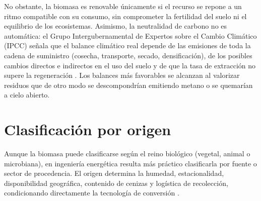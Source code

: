 No obstante, la biomasa es renovable únicamente si el recurso se repone a un ritmo compatible con su consumo, sin comprometer la fertilidad del suelo ni el equilibrio de los ecosistemas. Asimismo, la neutralidad de carbono no es automática: el Grupo Intergubernamental de Expertos sobre el Cambio Climático (IPCC) señala que el balance climático real depende de las emisiones de toda la cadena de suministro (cosecha, transporte, secado, densificación), de los posibles cambios directos e indirectos en el uso del suelo y de que la tasa de extracción no supere la regeneración \cite{chum2011ipcc}. Los balances más favorables se alcanzan al valorizar residuos que de otro modo se descompondrían emitiendo metano o se quemarían a cielo abierto.

\section{Clasificación por origen}
\label{sec:clasificacion_origen}

Aunque la biomasa puede clasificarse según el reino biológico (vegetal, animal o microbiana), en ingeniería energética resulta más práctico clasificarla por fuente o sector de procedencia. El origen determina la humedad, estacionalidad, disponibilidad geográfica, contenido de cenizas y logística de recolección, condicionando directamente la tecnología de conversión \cite{irena2023residues}.

